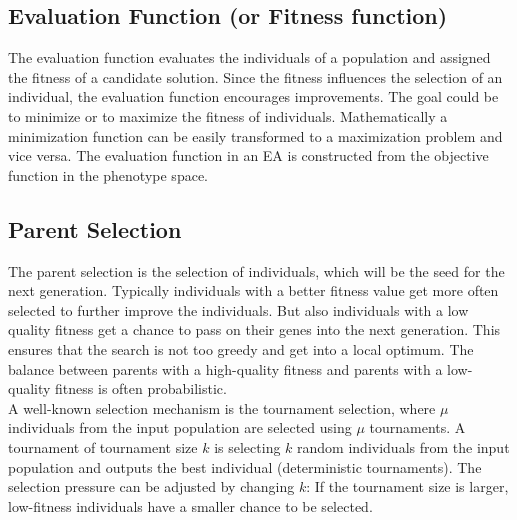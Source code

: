         \subsection{Evaluation Function (or Fitness function)}
        The evaluation function evaluates the individuals of a population and assigned the fitness of a candidate solution. Since the fitness influences the selection of an individual, the evaluation function encourages improvements. The goal could be to minimize or to maximize the fitness of individuals. Mathematically a minimization function can be easily transformed to a maximization problem and vice versa. The evaluation function in an EA is constructed from the objective function in the phenotype space.
        
        \subsection{Parent Selection}
        \label{sec:parentSelection}
        The parent selection is the selection of individuals, which will be the seed for the next generation. Typically individuals with a better fitness value get more often selected to further improve the individuals. But also individuals with a low quality fitness get a chance to pass on their genes into the next generation. This ensures that the search is not too greedy and get into a local optimum. The balance between parents with a high-quality fitness and parents with a low-quality fitness is often probabilistic.\\
        A well-known selection mechanism is the tournament selection, where $\mu$ individuals from the input population are selected using $\mu$ tournaments. A tournament of tournament size $k$ is selecting $k$ random individuals from the input population and outputs the best individual (deterministic tournaments)\cite{Eiben}. The selection pressure can be adjusted by changing $k$: If the tournament size is larger, low-fitness individuals have a smaller chance to be selected.
           

